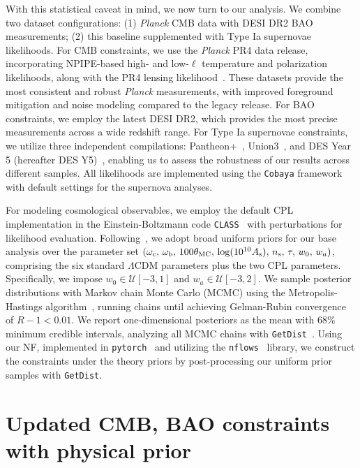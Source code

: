 With this statistical caveat in mind, we now turn to our analysis. We combine two dataset configurations:  (1) \textit{Planck} CMB data with DESI DR2 BAO measurements; (2) this baseline supplemented with Type Ia supernovae likelihoods.
For CMB constraints, we use the \textit{Planck} PR4 data release, incorporating NPIPE-based high- and low-$\ell$ temperature and polarization likelihoods, along with the PR4 lensing likelihood~\cite{Efstathiou:2019mdh,Rosenberg:2022sdy,Carron:2022eyg}. These datasets provide the most consistent and robust \textit{Planck} measurements, with improved foreground mitigation and noise modeling compared to the legacy release.
For BAO constraints, we employ the latest DESI DR2, which provides the most precise  measurements across a wide redshift range. For Type Ia supernovae constraints, we utilize three independent compilations: Pantheon+~\cite{Scolnic:2021amr,Brout:2022vxf}, Union3~\cite{Rubin:2023jdq}, and DES Year 5 (hereafter DES Y5)~\cite{DES:2024jxu}, enabling us to assess the robustness of our results across different samples. All likelihoods are implemented using the \texttt{Cobaya} framework~\citep{Torrado:2020dgo} with default settings for the supernova analyses.

For modeling cosmological observables, we employ the default CPL implementation in the Einstein-Boltzmann code \texttt{CLASS}~\cite{Blas:2011rf} with perturbations for likelihood evaluation. Following~\cite{DESI:2025zgx}, we adopt broad uniform priors for our base analysis over the parameter set $(\omega_{\rm c}, \,\omega_{\rm b},\, 100\theta_{\rm MC},\, \log(10^{10}A_{\rm s}),\, n_{\rm s},\, \tau,\, w_0,\, w_a)$, comprising the six standard $\Lambda$CDM parameters plus the two CPL parameters. Specifically, we impose $w_0 \in \mathcal{U}[-3,1]$ and $w_a \in \mathcal{U}[-3,2]$. We sample posterior distributions with Markov chain Monte Carlo (MCMC) using the Metropolis-Hastings algorithm~\cite{2005math......2099N}, running chains until achieving Gelman-Rubin convergence~\cite{Gelman:1992zz} of $R - 1 < 0.01$. We report one-dimensional posteriors as the mean with 68\% minimum credible intervals, analyzing all MCMC chains with \texttt{GetDist}~\cite{Lewis:2019xzd}. Using our NF, implemented in \texttt{pytorch}~\cite{2019arXiv191201703P} and utilizing the \texttt{nflows}~\cite{nflows} library, we construct the constraints under the theory priors by post-processing our uniform prior samples with \texttt{GetDist}.



\section{Updated CMB, BAO constraints with physical prior}\label{sec:ch11-Results}


